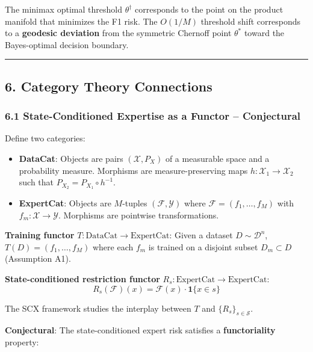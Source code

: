 \documentclass[
  12pt,
]{article}
\begin{document}
The minimax optimal threshold \(\theta^\dagger\) corresponds to the
point on the product manifold that minimizes the F1 risk. The \(O(1/M)\)
threshold shift corresponds to a \textbf{geodesic deviation} from the
symmetric Chernoff point \(\theta^*\) toward the Bayes-optimal decision
boundary.

\begin{center}\rule{0.5\linewidth}{0.5pt}\end{center}

\subsection{6. Category Theory
Connections}\label{category-theory-connections}

\subsubsection{6.1 State-Conditioned Expertise as a Functor --
Conjectural}\label{state-conditioned-expertise-as-a-functor-conjectural}

Define two categories:

\begin{itemize}
\item
  \textbf{DataCat}: Objects are pairs \((\mathcal{X}, P_X)\) of a
  measurable space and a probability measure. Morphisms are
  measure-preserving maps \(h: \mathcal{X}_1 \to \mathcal{X}_2\) such
  that \(P_{X_2} = P_{X_1} \circ h^{-1}\).
\item
  \textbf{ExpertCat}: Objects are \(M\)-tuples
  \((\mathcal{F}, \mathcal{Y})\) where
  \(\mathcal{F} = (f_1, \dots, f_M)\) with
  \(f_m: \mathcal{X} \to \mathcal{Y}\). Morphisms are pointwise
  transformations.
\end{itemize}

\textbf{Training functor} \(T: \text{DataCat} \to \text{ExpertCat}\):
Given a dataset \(D \sim \mathcal{D}^n\), \(T(D) = (f_1, \dots, f_M)\)
where each \(f_m\) is trained on a disjoint subset \(D_m \subset D\)
(Assumption A1).

\textbf{State-conditioned restriction functor}
\(R_s: \text{ExpertCat} \to \text{ExpertCat}\):
\[R_s(\mathcal{F})(x) = \mathcal{F}(x) \cdot \mathbf{1}\{x \in s\}\]

The SCX framework studies the interplay between \(T\) and
\(\{R_s\}_{s \in \mathcal{S}}\).

\textbf{Conjectural}: The state-conditioned expert risk satisfies a
\textbf{functoriality} property:
\end{document}
